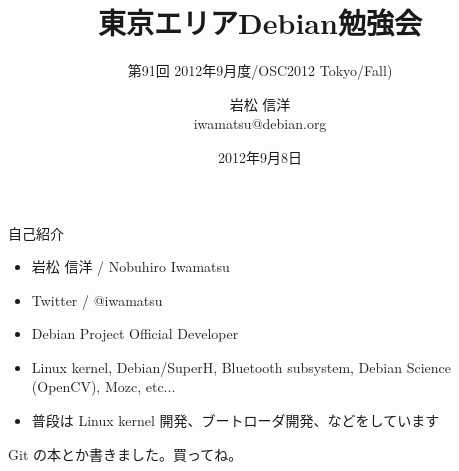 \title{東京エリアDebian勉強会}
\subtitle{第91回 2012年9月度/OSC2012 Tokyo/Fall)}
\author{岩松 信洋\\iwamatsu@debian.org}
\date{2012年9月8日}



\frame{\titlepage{}}

\begin{frame}{自己紹介}

\begin{itemize}
\item 岩松 信洋 / Nobuhiro Iwamatsu
\item Twitter / @iwamatsu
\item Debian Project Official Developer
\item Linux kernel, Debian/SuperH, Bluetooth subsystem, Debian Science (OpenCV), Mozc, etc...
\item 普段は Linux kernel 開発、ブートローダ開発、などをしています
\end{itemize}

\end{frame}

\begin{frame}[plain]

\begin{center}
Git の本とか書きました。買ってね。
\end{center}

\end{frame}


